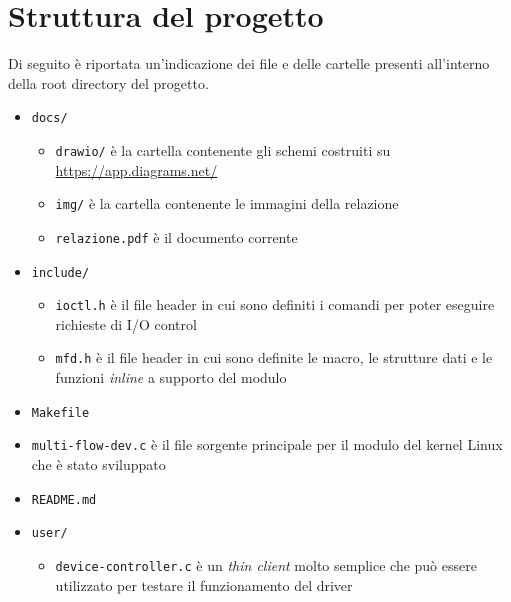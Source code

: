 \documentclass{article}
\begin{document}
\section{Struttura del progetto}
Di seguito è riportata un'indicazione dei file e delle cartelle presenti all'interno della root directory del progetto.
\begin{itemize}
\item \texttt{docs/}
\begin{itemize}
\item \texttt{drawio/} è la cartella contenente gli schemi costruiti su \url{https://app.diagrams.net/}
\item \texttt{img/} è la cartella contenente le immagini della relazione
\item \texttt{relazione.pdf} è il documento corrente
\end{itemize}
\item \texttt{include/}
\begin{itemize}
\item \texttt{ioctl.h} è il file header in cui sono definiti i comandi per poter eseguire richieste di I/O control
\item \texttt{mfd.h} è il file header in cui sono definite le macro, le strutture dati e le funzioni \textsl{inline} a supporto del modulo
\end{itemize}
\item \texttt{Makefile}
\item \texttt{multi-flow-dev.c} è il file sorgente principale per il modulo del kernel Linux che è stato sviluppato
\item \texttt{README.md}
\item \texttt{user/}
\begin{itemize}
\item \texttt{device-controller.c} è un \textsl{thin client} molto semplice che può essere utilizzato per testare il funzionamento del driver
\end{itemize}
\end{itemize}
\end{document}
